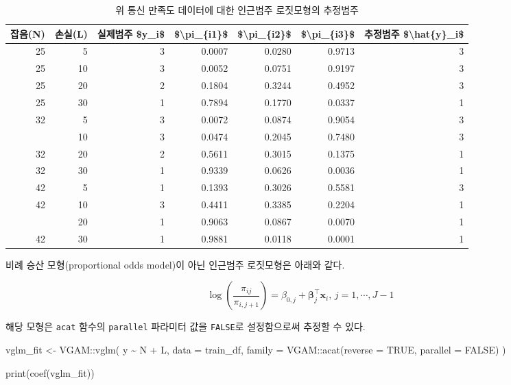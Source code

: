 \documentclass[
]{book}
\newenvironment{Shaded}{\begin{snugshade}}{\end{snugshade}}
\newcommand{\AttributeTok}[1]{\textcolor[rgb]{0.77,0.63,0.00}{#1}}
\newcommand{\ConstantTok}[1]{\textcolor[rgb]{0.00,0.00,0.00}{#1}}
\newcommand{\FunctionTok}[1]{\textcolor[rgb]{0.00,0.00,0.00}{#1}}
\newcommand{\NormalTok}[1]{#1}
\newcommand{\OtherTok}[1]{\textcolor[rgb]{0.56,0.35,0.01}{#1}}
\newcommand{\SpecialCharTok}[1]{\textcolor[rgb]{0.00,0.00,0.00}{#1}}
\begin{document}
\begin{table}

\caption{\label{tab:adjacent-category-logit-prediction}위 통신 만족도 데이터에 대한 인근범주 로짓모형의 추정범주}
\centering
\begin{tabular}[t]{rrrrrrr}
\toprule
잡음(N) & 손실(L) & 실제범주 \$y\_i\$ & \$\textbackslash{}pi\_\{i1\}\$ & \$\textbackslash{}pi\_\{i2\}\$ & \$\textbackslash{}pi\_\{i3\}\$ & 추정범주 \$\textbackslash{}hat\{y\}\_i\$\\
\midrule
25 & 5 & 3 & 0.0007 & 0.0280 & 0.9713 & 3\\
25 & 10 & 3 & 0.0052 & 0.0751 & 0.9197 & 3\\
25 & 20 & 2 & 0.1804 & 0.3244 & 0.4952 & 3\\
25 & 30 & 1 & 0.7894 & 0.1770 & 0.0337 & 1\\
32 & 5 & 3 & 0.0072 & 0.0874 & 0.9054 & 3\\
\addlinespace
32 & 10 & 3 & 0.0474 & 0.2045 & 0.7480 & 3\\
32 & 20 & 2 & 0.5611 & 0.3015 & 0.1375 & 1\\
32 & 30 & 1 & 0.9339 & 0.0626 & 0.0036 & 1\\
42 & 5 & 1 & 0.1393 & 0.3026 & 0.5581 & 3\\
42 & 10 & 3 & 0.4411 & 0.3385 & 0.2204 & 1\\
\addlinespace
42 & 20 & 1 & 0.9063 & 0.0867 & 0.0070 & 1\\
42 & 30 & 1 & 0.9881 & 0.0118 & 0.0001 & 1\\
\bottomrule
\end{tabular}
\end{table}

비례 승산 모형(proportional odds model)이 아닌 인근범주 로짓모형은 아래와 같다.

\begin{equation}
\log \left( \frac{\pi_{ij}}{\pi_{i,j+1}} \right) = \beta_{0,j} + \boldsymbol\beta_j^\top \mathbf{x}_i, \, j = 1, \cdots, J - 1
\label{eq:adjacent-category-logit-nonproportional}
\end{equation}

해당 모형은 \texttt{acat} 함수의 \texttt{parallel} 파라미터 값을 \texttt{FALSE}로 설정함으로써 추정할 수 있다.

\begin{Shaded}
\begin{Highlighting}[]
\NormalTok{vglm\_fit }\OtherTok{\textless{}{-}}\NormalTok{ VGAM}\SpecialCharTok{::}\FunctionTok{vglm}\NormalTok{(}
\NormalTok{  y }\SpecialCharTok{\textasciitilde{}}\NormalTok{ N }\SpecialCharTok{+}\NormalTok{ L,}
  \AttributeTok{data =}\NormalTok{ train\_df,}
  \AttributeTok{family =}\NormalTok{ VGAM}\SpecialCharTok{::}\FunctionTok{acat}\NormalTok{(}\AttributeTok{reverse =} \ConstantTok{TRUE}\NormalTok{, }\AttributeTok{parallel =} \ConstantTok{FALSE}\NormalTok{)}
\NormalTok{  )}

\FunctionTok{print}\NormalTok{(}\FunctionTok{coef}\NormalTok{(vglm\_fit))}
\end{Highlighting}
\end{Shaded}
\end{document}
